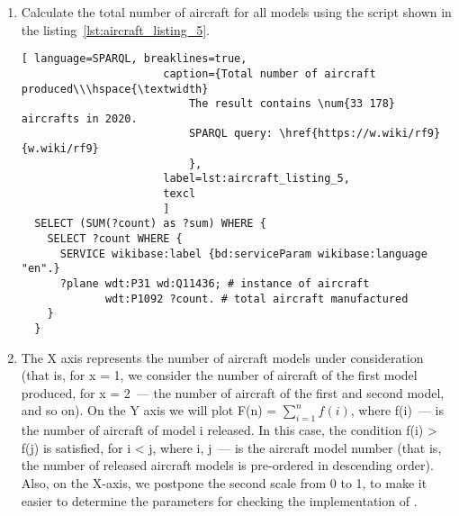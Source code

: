 \begin{enumerate} 
  \item Calculate the total number of aircraft for all models using the script shown in the listing~\ref{lst:aircraft_listing_5}.

  \begin{lstlisting}[ language=SPARQL, breaklines=true,  
                      caption={Total number of aircraft produced\\\hspace{\textwidth}
                          The result contains \num{33 178} aircrafts in 2020.
                          SPARQL query: \href{https://w.wiki/rf9}{w.wiki/rf9}
                          },
                      label=lst:aircraft_listing_5,
                      texcl 
                      ]
  SELECT (SUM(?count) as ?sum) WHERE {
    SELECT ?count WHERE {
      SERVICE wikibase:label {bd:serviceParam wikibase:language "en".}
      ?plane wdt:P31 wd:Q11436; # instance of aircraft
			 wdt:P1092 ?count. # total aircraft manufactured
    }
  }
  \end{lstlisting}
  
  \label{question:aircraft_question_2}
  
  \item The X axis represents the number of aircraft models under consideration (that is, for x = 1, we consider the number of aircraft of the first model 
  produced, for x = 2~--- the number of aircraft of the first and second model, and so on). 
  On the Y axis we will plot F(n) = $\sum\limits_{i=1}^n f(i)$, where f(i)~--- is the number of aircraft of model i released. 
  In this case, the condition f(i) > f(j) is satisfied, for i < j, where i, j~--- is the aircraft model number 
  (that is, the number of released aircraft models is pre-ordered in descending order). Also, on the X-axis, we postpone the second scale from 0 to 1, 
  to make it easier to determine the parameters for checking the implementation of .
  
\end{enumerate}



